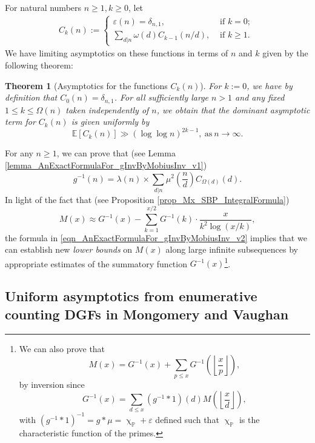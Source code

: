 \documentclass[11pt,reqno,a4letter]{article}
\numberwithin{figure}{section}
\numberwithin{table}{section}
\renewcommand{\chi}{\upchi}
\newcommand{\Floor}[2]{\ensuremath{\left\lfloor \frac{#1}{#2} \right\rfloor}}
\theoremstyle{plain}
\newtheorem{theorem}{Theorem}
\numberwithin{theorem}{section}
\theoremstyle{definition}
\begin{document}
For natural numbers $n \geq 1, k \geq 0$, let 
\begin{align*} 
C_k(n) := \begin{cases} 
     \varepsilon(n) = \delta_{n,1}, & \text{ if $k = 0$; } \\ 
     \sum\limits_{d|n} \omega(d) C_{k-1}(n/d), & \text{ if $k \geq 1$. } 
     \end{cases} 
\end{align*} 
We have limiting asymptotics on these functions in terms of $n$ and 
$k$ given by the following theorem: 

\begin{theorem}[Asymptotics for the functions $C_k(n)$] 
\label{theorem_Ckn_GeneralAsymptoticsForms} 
For $k := 0$, we have by definition that $C_0(n) = \delta_{n,1}$. 
For all sufficiently large $n > 1$ and any fixed $1 \leq k \leq \Omega(n)$ 
taken independently of $n$, 
we obtain that the dominant asymptotic term for $C_k(n)$ is given uniformly by 
\[
\mathbb{E}[C_k(n)] \gg (\log\log n)^{2k-1}, \mathrm{\ as\ }n \rightarrow \infty. 
\]
\end{theorem} 

For any $n \geq 1$, we can prove that (see Lemma \ref{lemma_AnExactFormulaFor_gInvByMobiusInv_v1})
\begin{equation} 
\label{eqn_AnExactFormulaFor_gInvByMobiusInv_v2} 
g^{-1}(n) = \lambda(n) \times \sum_{d|n} \mu^2\left(\frac{n}{d}\right) C_{\Omega(d)}(d). 
\end{equation} 
In light of the fact that (see Proposition \ref{prop_Mx_SBP_IntegralFormula}) 
\[
M(x) \approx G^{-1}(x) - \sum_{k=1}^{x/2} G^{-1}(k) \cdot \frac{x}{k^2 \log(x/k)}, 
\]
the formula in \eqref{eqn_AnExactFormulaFor_gInvByMobiusInv_v2} 
implies that we can establish new \emph{lower bounds} on $M(x)$ along large infinite subsequences 
by appropriate estimates of the summatory function $G^{-1}(x)$\footnote{ 
     We can also prove that 
     \[
     M(x) = G^{-1}(x) + \sum_{p \leq x} G^{-1}\left(\Floor{x}{p}\right), 
     \] 
     by inversion since 
     \[
     G^{-1}(x) = \sum_{d \leq x} (g^{-1} \ast 1)(d) M\left(\Floor{x}{d}\right), 
     \]
     with $(g^{-1} \ast 1)^{-1} = g \ast \mu = \chi_{\mathbb{P}} + \varepsilon$ 
     defined such that $\chi_{\mathbb{P}}$ is the characteristic function of the primes. 
}. 

\subsection{Uniform asymptotics from enumerative counting DGFs in Mongomery and Vaughan} 
\end{document}
